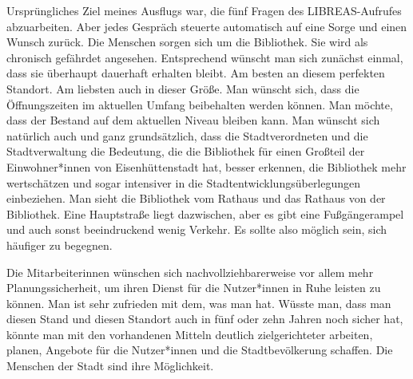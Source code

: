 \documentclass[a4paper,
fontsize=11pt,
oneside,
numbers=noperiodatend,
parskip=half-,
bibliography=totoc,
final
]{scrartcl}
\begin{document}
Ursprüngliches Ziel meines Ausflugs war, die fünf Fragen des
LIBREAS-Aufrufes abzuarbeiten. Aber jedes Gespräch steuerte automatisch
auf eine Sorge und einen Wunsch zurück. Die Menschen sorgen sich um die
Bibliothek. Sie wird als chronisch gefährdet angesehen. Entsprechend
wünscht man sich zunächst einmal, dass sie überhaupt dauerhaft erhalten
bleibt. Am besten an diesem perfekten Standort. Am liebsten auch in
dieser Größe. Man wünscht sich, dass die Öffnungszeiten im aktuellen
Umfang beibehalten werden können. Man möchte, dass der Bestand auf dem
aktuellen Niveau bleiben kann. Man wünscht sich natürlich auch und ganz
grundsätzlich, dass die Stadtverordneten und die Stadtverwaltung die
Bedeutung, die die Bibliothek für einen Großteil der Einwohner*innen von
Eisenhüttenstadt hat, besser erkennen, die Bibliothek mehr wertschätzen
und sogar intensiver in die Stadtentwicklungsüberlegungen einbeziehen.
Man sieht die Bibliothek vom Rathaus und das Rathaus von der Bibliothek.
Eine Hauptstraße liegt dazwischen, aber es gibt eine Fußgängerampel und
auch sonst beeindruckend wenig Verkehr. Es sollte also möglich sein,
sich häufiger zu begegnen.

Die Mitarbeiterinnen wünschen sich nachvollziehbarerweise vor allem mehr
Planungssicherheit, um ihren Dienst für die Nutzer*innen in Ruhe leisten
zu können. Man ist sehr zufrieden mit dem, was man hat. Wüsste man, dass
man diesen Stand und diesen Standort auch in fünf oder zehn Jahren noch
sicher hat, könnte man mit den vorhandenen Mitteln deutlich
zielgerichteter arbeiten, planen, Angebote für die Nutzer*innen und die
Stadtbevölkerung schaffen. Die Menschen der Stadt sind ihre Möglichkeit.
\end{document}
